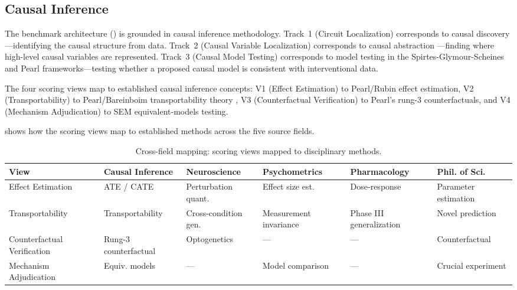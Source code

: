 \documentclass[10pt]{article}
\begin{document}
\subsection{Causal Inference}
\label{sec:causal}

The benchmark architecture () is grounded in causal inference methodology. Track~1 (Circuit Localization) corresponds to causal discovery \citep{spirtes2000causation}---identifying the causal structure from data. Track~2 (Causal Variable Localization) corresponds to causal abstraction \citep{geiger2023causal}---finding where high-level causal variables are represented. Track~3 (Causal Model Testing) corresponds to model testing in the Spirtes-Glymour-Scheines and Pearl frameworks---testing whether a proposed causal model is consistent with interventional data.

The four scoring views map to established causal inference concepts: V1 (Effect Estimation) to Pearl/Rubin effect estimation, V2 (Transportability) to Pearl/Bareinboim transportability theory \citep{pearl2011transportability}, V3 (Counterfactual Verification) to Pearl's rung-3 counterfactuals, and V4 (Mechanism Adjudication) to SEM equivalent-models testing.

 shows how the scoring views map to established methods across the five source fields.

%
\begin{table}[t]
\centering
\small
\renewcommand{\arraystretch}{1.08}
\caption{Cross-field mapping: scoring views mapped to disciplinary methods.}
\label{tab:crossfield}
\begin{tabular}{|p{2.2cm}|p{2.2cm}|p{2.2cm}|p{2.2cm}|p{2.2cm}|p{2.2cm}|}
\hline
\textbf{View} & \textbf{Causal Inference} & \textbf{Neuroscience} & \textbf{Psychometrics} & \textbf{Pharmacology} & \textbf{Phil. of Sci.} \\
\hline
Effect Estimation & ATE / CATE & Perturbation quant. & Effect size est. & Dose-response & Parameter estimation \\
\hline
Transportability & Transportability & Cross-condition gen. & Measurement invariance & Phase III generalization & Novel prediction \\
\hline
Counterfactual Verification & Rung-3 counterfactual & Optogenetics & --- & --- & Counterfactual \\
\hline
Mechanism Adjudication & Equiv. models & --- & Model comparison & --- & Crucial experiment \\
\hline
\end{tabular}
\end{table}
\end{document}
